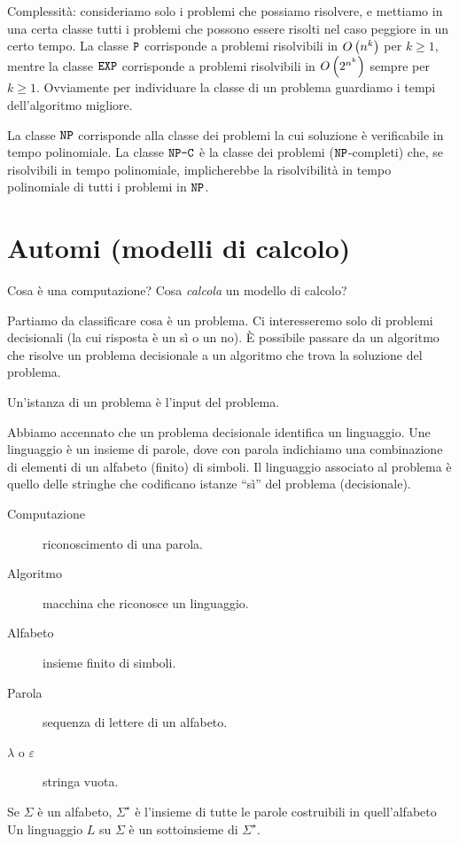 Complessit\`a: consideriamo solo i problemi che possiamo risolvere, e mettiamo in una certa classe tutti i problemi che possono essere risolti nel caso peggiore in un certo tempo.
La classe $\texttt{P}$ corrisponde a problemi risolvibili in $O\left( {n^k} \right)$ per $k \ge 1$, mentre la classe $\texttt{EXP}$ corrisponde a problemi risolvibili in $O\left( {2^{n^k}} \right)$ sempre per $k \ge 1$.
Ovviamente per individuare la classe di un problema guardiamo i tempi dell'algoritmo migliore.

La classe $\texttt{NP}$ corrisponde alla classe dei problemi la cui soluzione \`e verificabile in tempo polinomiale.
La classe $\texttt{NP-C}$ \`e la classe dei problemi ($\texttt{NP}$-completi) che, se risolvibili in tempo polinomiale, implicherebbe la risolvibilit\`a in tempo polinomiale di tutti i problemi in $\texttt{NP}$.

\chapter{Automi (modelli di calcolo)}

Cosa \`e una computazione? Cosa \emph{calcola} un modello di calcolo?

Partiamo da classificare cosa \`e un problema.
Ci interesseremo solo di problemi decisionali (la cui risposta \`e un s\`i o un no).
\`E possibile passare da un algoritmo che risolve un problema decisionale a un algoritmo che trova la soluzione del problema.

Un'istanza di un problema \`e l'input del problema.

Abbiamo accennato che un problema decisionale identifica un linguaggio.
Une linguaggio \`e un insieme di parole, dove con parola indichiamo una combinazione di elementi di un alfabeto (finito) di simboli.
Il linguaggio associato al problema \`e quello delle stringhe che codificano istanze ``s\`i'' del problema (decisionale).

\begin{description}
	\item[Computazione] riconoscimento di una parola.
	\item[Algoritmo] macchina che riconosce un linguaggio.
	\item[Alfabeto] insieme finito di simboli.
	\item[Parola] sequenza di lettere di un alfabeto.
	\item[$\lambda$ o $\varepsilon$] stringa vuota.
\end{description}

Se $\Sigma$ \`e un alfabeto, $\Sigma^{\star}$ \`e l'insieme di tutte le parole costruibili in quell'alfabeto
Un linguaggio $L$ su $\Sigma$ \`e un sottoinsieme di $\Sigma^{\star}$.

